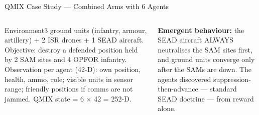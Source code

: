 \documentclass[aspectratio=169,10pt,t]{beamer}
\begin{document}
\begin{frame}{QMIX Case Study --- Combined Arms with 6 Agents}
\begin{columns}[T]
\begin{cbox}[ISSAnavy]{Environment}\scriptsize 3 ground units (infantry, armour, artillery) + 2 ISR drones + 1 SEAD aircraft. Objective: destroy a defended position held by 2 SAM sites and 4 OPFOR infantry. Observation per agent (42-D): own position, health, ammo, role; visible units in sensor range; friendly positions if comms are not jammed. QMIX state = 6 $\times$ 42 = 252-D.\end{cbox}
\begin{rbox}\scriptsize\textbf{Emergent behaviour:} the SEAD aircraft ALWAYS neutralises the SAM sites first, and ground units converge only after the SAMs are down. The agents discovered suppression-then-advance --- standard SEAD doctrine --- from reward alone.\end{rbox}
\end{columns}
\end{frame}
\end{document}
